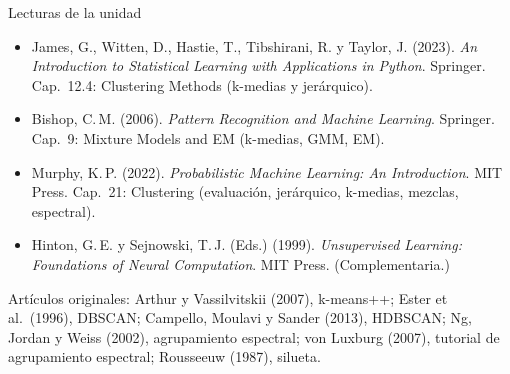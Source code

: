 \documentclass[aspectratio=169,11pt]{beamer}
\begin{document}
\begin{frame}{Lecturas de la unidad}
  \begin{itemize}
    \item James, G., Witten, D., Hastie, T., Tibshirani, R. y Taylor, J. (2023).
          \emph{An Introduction to Statistical Learning with Applications in Python}.
          Springer. \alert{Cap.~12.4: Clustering Methods} (k-medias y jerárquico).
    \item Bishop, C.\,M. (2006). \emph{Pattern Recognition and Machine Learning}.
          Springer. \alert{Cap.~9: Mixture Models and EM} (k-medias, GMM, EM).
    \item Murphy, K.\,P. (2022). \emph{Probabilistic Machine Learning: An Introduction}.
          MIT Press. \alert{Cap.~21: Clustering} (evaluación, jerárquico, k-medias, mezclas, espectral).
    \item Hinton, G.\,E. y Sejnowski, T.\,J. (Eds.) (1999). \emph{Unsupervised Learning:
          Foundations of Neural Computation}. MIT Press. (Complementaria.)
  \end{itemize}
  \vspace{4pt}
  {\small Artículos originales: Arthur y Vassilvitskii (2007), k-means++; Ester et al.\ (1996), DBSCAN;
  Campello, Moulavi y Sander (2013), HDBSCAN; Ng, Jordan y Weiss (2002), agrupamiento espectral;
  von Luxburg (2007), tutorial de agrupamiento espectral; Rousseeuw (1987), silueta.}
\end{frame}
\end{document}
